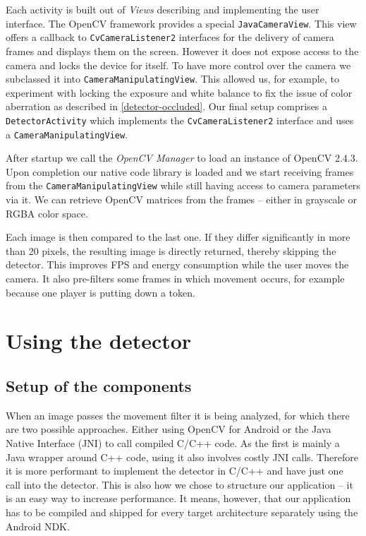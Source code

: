 	Each activity is built out of \textit{Views} describing and implementing the user interface. The OpenCV framework provides a special \texttt{JavaCameraView}. This view offers a callback to \texttt{CvCameraListener2} interfaces for the delivery of camera frames and displays them on the screen. However it does not expose access to the camera and locks the device for itself. To have more control over the camera we subclassed it into \texttt{CameraManipulatingView}. This allowed us, for example, to experiment with locking the exposure and white balance to fix the issue of color aberration as described in \autoref{detector-occluded}. Our final setup comprises a \texttt{DetectorActivity} which implements the \texttt{CvCameraListener2} interface and uses a \texttt{CameraManipulatingView}.

	After startup we call the \textit{OpenCV Manager} to load an instance of OpenCV 2.4.3. Upon completion our native code library is loaded and we start receiving frames from the \texttt{CameraManipulatingView} while still having access to camera parameters via it. We can retrieve OpenCV matrices from the frames -- either in grayscale or RGBA color space.

	Each image is then compared to the last one. If they differ significantly in more than 20 pixels, the resulting image is directly returned, thereby skipping the detector. This improves FPS and energy consumption while the user moves the camera. It also pre-filters some frames in which movement occurs, for example because one player is putting down a token.

	\section{Using the detector}
	\label{android-detector}
	\subsection{Setup of the components}
	\label{android-detector-setup}
	When an image passes the movement filter it is being analyzed, for which there are two possible approaches. Either using OpenCV for Android or the Java Native Interface (JNI) to call compiled C/C++ code. As the first is mainly a Java wrapper around C++ code, using it also involves costly JNI calls. Therefore it is more performant to implement the detector in C/C++ and have just one call into the detector. This is also how we chose to structure our application -- it is an easy way to increase performance. It means, however, that our application has to be compiled and shipped for every target architecture separately using the Android NDK.

